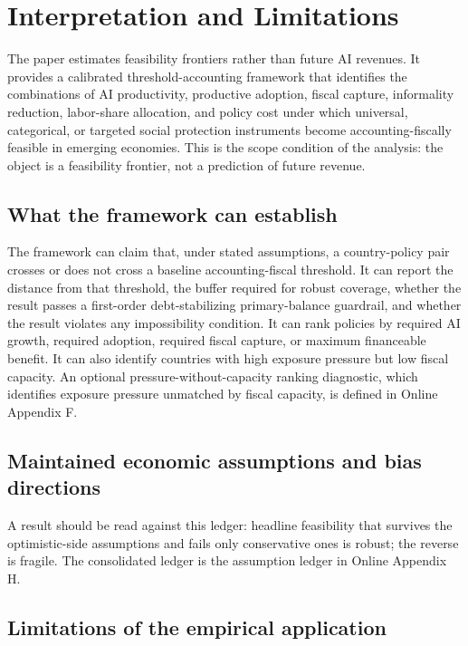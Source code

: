 \documentclass[11pt,a4paper]{article}
\begin{document}
\section{Interpretation and Limitations}\label{sec:claims}

The paper estimates feasibility frontiers rather than future AI revenues. It provides a calibrated threshold-accounting framework that identifies the combinations
of AI productivity, productive adoption, fiscal capture, informality reduction, labor-share
allocation, and policy cost under which universal, categorical, or targeted social protection
instruments become accounting-fiscally feasible in emerging economies. This is the scope
condition of the analysis: the object is a feasibility frontier, not a prediction of future
revenue.

\subsection{What the framework can establish}

The framework can claim that, under stated assumptions, a country-policy pair crosses or does not cross a baseline accounting-fiscal threshold. It can report the distance from that threshold, the buffer required for robust coverage, whether the result passes a first-order debt-stabilizing primary-balance guardrail, and whether the result violates any impossibility condition. It can rank policies by required AI growth, required adoption, required fiscal capture, or maximum financeable benefit. It can also identify countries with high exposure pressure but low fiscal capacity. An optional pressure-without-capacity ranking diagnostic, which identifies exposure pressure unmatched by fiscal capacity, is defined in Online Appendix F.

\subsection{Maintained economic assumptions and bias directions}

A result should be read against this ledger: headline feasibility that survives the optimistic-side assumptions and fails only conservative ones is robust; the reverse is fragile. The consolidated ledger is the assumption ledger in Online Appendix H.

\subsection{Limitations of the empirical application}\label{subsec:results_limitations}
\end{document}
